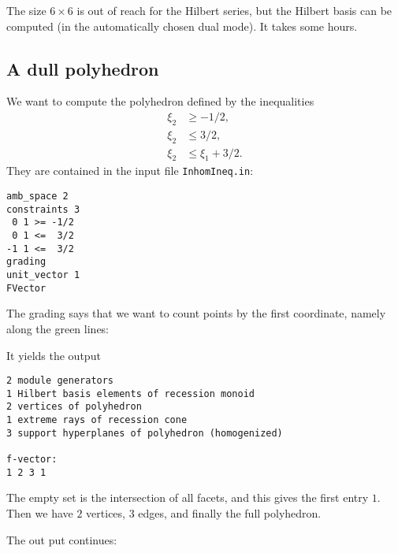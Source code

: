 \documentclass[12pt,a4paper]{scrartcl}
\theoremstyle{definition}
\begin{document}
The size $6\times 6$ is out of reach for the Hilbert series, but the Hilbert basis can be computed (in the automatically chosen dual mode). It takes some hours.

\subsection{A dull polyhedron}\label{inhom_ineq_ex}

We want to compute the polyhedron defined by the inequalities
\begin{align*}
	\xi_2 &\ge -1/2,\\
	\xi_2 &\le 3/2,\\
	\xi_2 &\le \xi_1+3/2.
\end{align*}
They are contained in the input file \verb|InhomIneq.in|:
\begin{Verbatim}
amb_space 2
constraints 3
 0 1 >= -1/2
 0 1 <=  3/2
-1 1 <=  3/2
grading
unit_vector 1
FVector
\end{Verbatim}
The grading says that we want to count points by the first coordinate, namely along the green lines:
\begin{center}
\end{center}

It yields the output
\begin{Verbatim}
2 module generators
1 Hilbert basis elements of recession monoid
2 vertices of polyhedron
1 extreme rays of recession cone
3 support hyperplanes of polyhedron (homogenized)

f-vector:
1 2 3 1 
\end{Verbatim}
The empty set is the intersection of all facets, and this gives the first entry $1$. Then we have $2$ vertices, $3$ edges, and finally the full polyhedron.

The out put continues:
\end{document}
